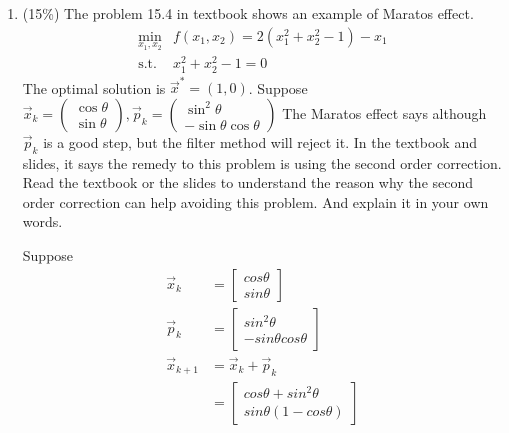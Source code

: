 \documentclass[a4paper,10pt]{article}
\begin{document}
\begin{enumerate}
{In fact, the smallest possible condition number is $1$, where an error is neither magnified nor diminished.
}

\item (15\%) The problem 15.4 in textbook shows an example of Maratos effect.
		\begin{align*}
		\min_{x_1, x_2} & f( x_1, x_2 ) = 2( x_1^2 + x_2^2 -1) -x_1\\
		\mbox{s.t. } & x_1^2 + x_2^2 -1=0
		\end{align*}
	The optimal solution is $\vec{x}^* = (1,0)$. Suppose 
	$\vec{x}_k =
		\left(
		\begin{array}{l}
			\cos \theta\\
			\sin \theta
		\end{array} \right),
		\vec{p}_k =
		\left(\begin{array}{c}
			\sin^2 \theta\\
			- \sin \theta \cos \theta
		\end{array} \right)$
	The Maratos effect says although $\vec{p}_k$ is a good step, but the filter method will reject it. In the textbook and slides, 
	it says the remedy to this problem is using the second order correction. Read the textbook or the slides to understand the reason why the second order correction can help avoiding this problem. And explain it in your own words. 
    
    {\color{blue}
        Suppose 
        \begin{align}
            \vec{x}_k &= \begin{bmatrix} cos \theta \\ sin \theta \end{bmatrix} \\
            \vec{p}_k &= \begin{bmatrix} sin^2 \theta \\ - sin \theta cos \theta \end{bmatrix}\\
            \vec{x}_{k+1} &= \vec{x}_k + \vec{p}_k \\
            &= \begin{bmatrix} cos \theta + sin^2 \theta \\ sin \theta (1 - cos \theta) \end{bmatrix}
        \end{align}
    }

\end{enumerate}
\end{document}
